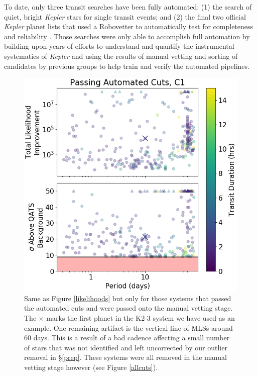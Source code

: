 \documentclass[twocolumn]{aastex62}
\newcommand{\project}[1]{\textsl{#1}}
\begin{document}
To date, only three transit searches have been fully automated: (1)
the \cite{for16} search of quiet, bright \project{Kepler} stars for
single transit events; and (2) the final two official \project{Kepler}
planet lists that used a Robovetter to automatically test for
completeness and reliability \citep{cou16, tho18}. Those searches were
only able to accomplish full automation by building upon years of
efforts to understand and quantify the instrumental systematics of
\project{Kepler} and using the results of manual vetting and sorting
of candidates by previous groups to help train and verify the
automated pipelines.

\begin{figure}[tbp]
\includegraphics[width=\columnwidth]{autocuts.png}
\caption{Same as Figure \ref{likelihoods} but only for those systems
  that passed the automated cuts and were passed onto the manual
  vetting stage. The $\times$ marks the first planet in the K2-3
  system we have used as an example. One remaining artifact is the
  vertical line of MLSs around 60 days. This is a result of a bad
  cadence affecting a small number of stars that was not identified
  and left uncorrected by our outlier removal in \S\ref{prep}.  These
  systems were all removed in the manual vetting stage however (see
  Figure \ref{allcuts}). \label{autocuts}}
\end{figure}
\end{document}
